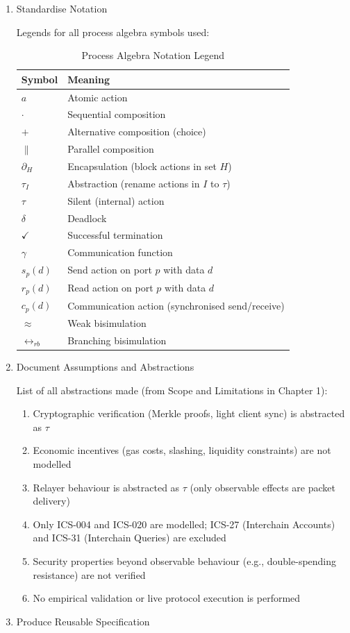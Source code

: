 \begin{enumerate}
\item
  Standardise Notation

  Legends for all process algebra symbols used:

  \begin{table}[h]
  \centering
  \begin{tabular}{|l|l|}
  \hline
  \textbf{Symbol} & \textbf{Meaning} \\
  \hline
  \(a\) & Atomic action \\
  \(\cdot\) & Sequential composition \\
  \(+\) & Alternative composition (choice) \\
  \(\parallel\) & Parallel composition \\
  \(\partial_H\) & Encapsulation (block actions in set \(H\)) \\
  \(\tau_I\) & Abstraction (rename actions in \(I\) to \(\tau\)) \\
  \(\tau\) & Silent (internal) action \\
  \(\delta\) & Deadlock \\
  \(\checkmark\) & Successful termination \\
  \(\gamma\) & Communication function \\
  \(s_p(d)\) & Send action on port \(p\) with data \(d\) \\
  \(r_p(d)\) & Read action on port \(p\) with data \(d\) \\
  \(c_p(d)\) & Communication action (synchronised send/receive) \\
  \(\approx\) & Weak bisimulation \\
  \(\leftrightarrow_{rb}\) & Branching bisimulation \\
  \hline
  \end{tabular}
  \caption{Process Algebra Notation Legend}
  \end{table}
\item
  Document Assumptions and Abstractions

  List of all abstractions made (from Scope and Limitations in Chapter
  1):

  \begin{enumerate}
      \item Cryptographic verification (Merkle proofs, light client sync) is abstracted as \(\tau\)
      \item Economic incentives (gas costs, slashing, liquidity constraints) are not modelled
      \item Relayer behaviour is abstracted as \(\tau\) (only observable effects are packet delivery)
      \item Only ICS-004 and ICS-020 are modelled; ICS-27 (Interchain Accounts) and ICS-31 (Interchain Queries) are excluded
      \item Security properties beyond observable behaviour (e.g., double-spending resistance) are not verified
      \item No empirical validation or live protocol execution is performed
  \end{enumerate}
\item
  Produce Reusable Specification


\end{enumerate}
